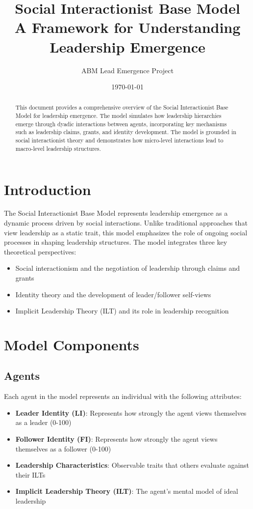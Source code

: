 \documentclass[12pt]{article}
\title{Social Interactionist Base Model\\
\large A Framework for Understanding Leadership Emergence}
\author{ABM Lead Emergence Project}
\date{\today}
\begin{document}
\maketitle

\begin{abstract}
This document provides a comprehensive overview of the Social Interactionist Base Model for leadership emergence. The model simulates how leadership hierarchies emerge through dyadic interactions between agents, incorporating key mechanisms such as leadership claims, grants, and identity development. The model is grounded in social interactionist theory and demonstrates how micro-level interactions lead to macro-level leadership structures.
\end{abstract}

\tableofcontents

\section{Introduction}
The Social Interactionist Base Model represents leadership emergence as a dynamic process driven by social interactions. Unlike traditional approaches that view leadership as a static trait, this model emphasizes the role of ongoing social processes in shaping leadership structures. The model integrates three key theoretical perspectives:

\begin{itemize}
    \item Social interactionism and the negotiation of leadership through claims and grants
    \item Identity theory and the development of leader/follower self-views
    \item Implicit Leadership Theory (ILT) and its role in leadership recognition
\end{itemize}

\section{Model Components}

\subsection{Agents}
Each agent in the model represents an individual with the following attributes:

\begin{itemize}
    \item \textbf{Leader Identity (LI)}: Represents how strongly the agent views themselves as a leader (0-100)
    \item \textbf{Follower Identity (FI)}: Represents how strongly the agent views themselves as a follower (0-100)
    \item \textbf{Leadership Characteristics}: Observable traits that others evaluate against their ILTs
    \item \textbf{Implicit Leadership Theory (ILT)}: The agent's mental model of ideal leadership
\end{itemize}
\end{document}
